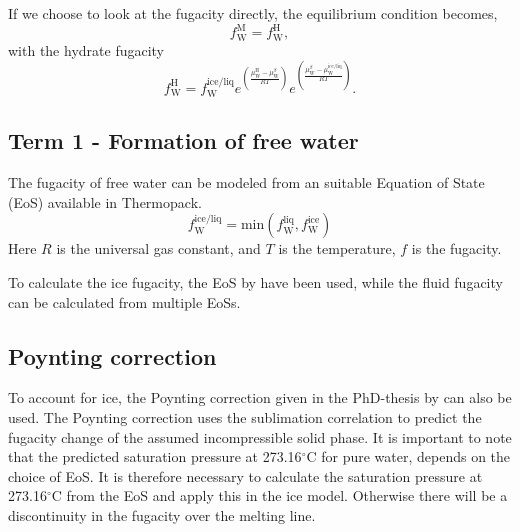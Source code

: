 \documentclass[english]{../thermomemo/thermomemo}
\newcommand{\celsius}{\ensuremath{^\circ\text{C}}}
\newcommand{\liq}{\text{liq}}
\newcommand{\hyd}{\text{H}}
\newcommand{\wat}{\text{W}}
\newcommand{\mix}{\text{M}}
\newcommand{\ice}{\text{ice}}
\newcommand{\free}{{\ice/\liq}}
\begin{document}
If we choose to look at the fugacity directly, the equilibrium
condition becomes,
\begin{equation}
\label{eq:fug}
f_\wat^\mix = f_\wat^\hyd,
\end{equation}
with the hydrate fugacity
\begin{equation}
\label{eq:fug_hyd}
f_\wat^\hyd = f_\wat^\free e^{\left(\frac{\mu_\wat^\hyd - \mu_\wat^\beta}{RT}\right)} e^{\left(\frac{\mu_\wat^\beta - \mu_\wat^\free}{RT}\right)} .
\end{equation}

\subsection{Term 1 - Formation of free water}
The fugacity of free water can be modeled from
an suitable Equation of State (EoS) available in Thermopack.
\begin{equation}
  \label{eq:freewatform}
   f_\wat^\free = \text{min} \left( f_\wat^\liq, f_\wat^\ice \right)
\end{equation}
Here $R$ is the universal gas constant, and $T$ is the temperature,
$f$ is the fugacity.

To calculate the ice fugacity, the EoS by \citet{Feistel2006} have
been used, while the fluid fugacity can be calculated from multiple
EoSs.

\subsection{Poynting correction}
To account for ice, the Poynting correction given in the PhD-thesis by
\citet{Haghighi2009} can also be used. The Poynting correction uses the
\citet{Wagner1994} sublimation correlation to predict the fugacity
change of the assumed incompressible solid phase. It is important to
note that the predicted saturation pressure at 273.16\unit{\celsius}
for pure water, depends on the choice of EoS. It is
therefore necessary to calculate the saturation pressure at
273.16\unit{\celsius} from the EoS and apply this in the ice
model. Otherwise there will be a discontinuity in the fugacity over
the melting line.
\end{document}
